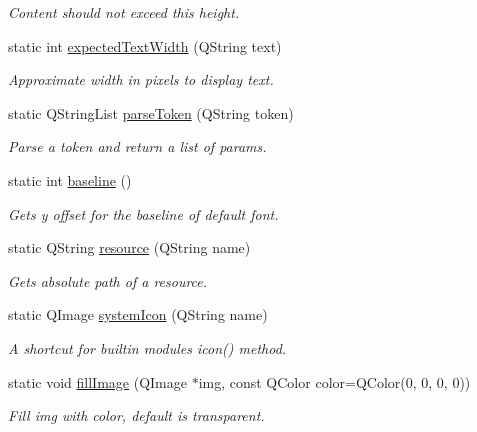 \begin{DoxyCompactItemize}
\begin{DoxyCompactList}\small\item\em \-Content should not exceed this height. \end{DoxyCompactList}\item 
\hypertarget{classRenderUtil_a9f3342e7a3319ac24796b2f7cb849cb8}{
static int \hyperlink{classRenderUtil_a9f3342e7a3319ac24796b2f7cb849cb8}{expected\-Text\-Width} (\-Q\-String text)}
\label{classRenderUtil_a9f3342e7a3319ac24796b2f7cb849cb8}

\begin{DoxyCompactList}\small\item\em \-Approximate width in pixels to display text. \end{DoxyCompactList}\item 
static \-Q\-String\-List \hyperlink{classRenderUtil_aff193438ccf137d2cb3abf8134a7a28e}{parse\-Token} (\-Q\-String token)
\begin{DoxyCompactList}\small\item\em \-Parse a token and return a list of params. \end{DoxyCompactList}\item 
static int \hyperlink{classRenderUtil_ad100ab8af0b6cb1287482cd2de9247b6}{baseline} ()
\begin{DoxyCompactList}\small\item\em \-Gets y offset for the baseline of default font. \end{DoxyCompactList}\item 
static \-Q\-String \hyperlink{classRenderUtil_a6f6d1bc0464ea829801e01f178a965dc}{resource} (\-Q\-String name)
\begin{DoxyCompactList}\small\item\em \-Gets absolute path of a resource. \end{DoxyCompactList}\item 
\hypertarget{classRenderUtil_abf53b2965107b8591da2ddc310317d50}{
static \-Q\-Image \hyperlink{classRenderUtil_abf53b2965107b8591da2ddc310317d50}{system\-Icon} (\-Q\-String name)}
\label{classRenderUtil_abf53b2965107b8591da2ddc310317d50}

\begin{DoxyCompactList}\small\item\em \-A shortcut for builtin modules icon() method. \end{DoxyCompactList}\item 
\hypertarget{classRenderUtil_a98ef2e5d1557bafdb59079fe536c75f7}{
static void \hyperlink{classRenderUtil_a98ef2e5d1557bafdb59079fe536c75f7}{fill\-Image} (\-Q\-Image $\ast$img, const \-Q\-Color color=\-Q\-Color(0, 0, 0, 0))}
\label{classRenderUtil_a98ef2e5d1557bafdb59079fe536c75f7}

\begin{DoxyCompactList}\small\item\em \-Fill img with color, default is transparent. \end{DoxyCompactList}\end{DoxyCompactItemize}


